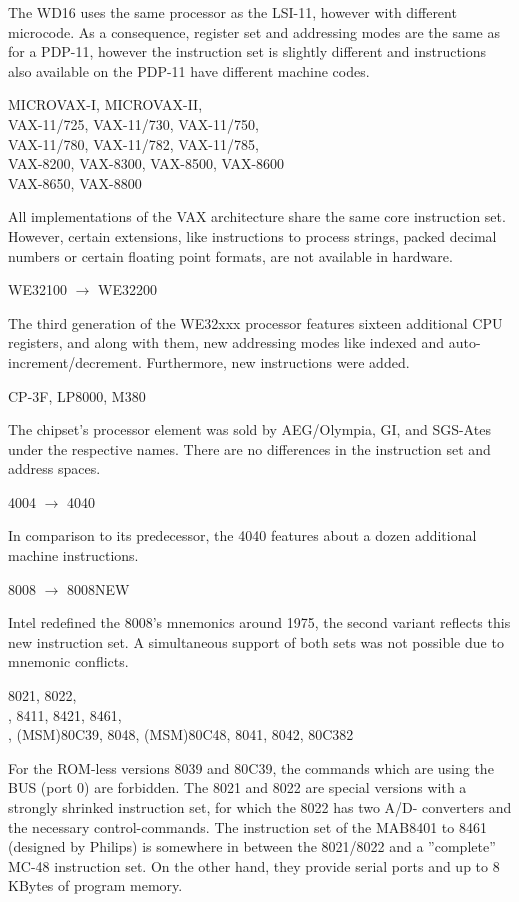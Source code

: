 \documentclass[12pt,twoside]{report}
\begin{document}
The WD16 uses the same processor as the LSI-11, however
with different microcode.  As a consequence, register set
and addressing modes are the same as for a PDP-11, however
the instruction set is slightly different and instructions
also available on the PDP-11 have different machine codes.
\begin{cpulist}
   MICROVAX-I, MICROVAX-II, \\
\> VAX-11/725, VAX-11/730, VAX-11/750, \\
\> VAX-11/780, VAX-11/782, VAX-11/785, \\
\> VAX-8200, VAX-8300, VAX-8500, VAX-8600 \\
\> VAX-8650, VAX-8800
\end{cpulist}
All implementations of the VAX architecture share the same
core instruction set.  However, certain extensions, like
instructions to process strings, packed decimal numbers or
certain floating point formats, are not available in hardware.
\begin{cpulist}
   WE32100 $\rightarrow$ WE32200
\end{cpulist}
The third generation of the WE32xxx processor features sixteen
additional CPU registers, and along with them, new addressing
modes like indexed and auto-increment/decrement.  Furthermore,
new instructions were added.
\begin{cpulist}
   CP-3F, LP8000, M380
\end{cpulist}
The chipset's processor element was sold by AEG/Olympia, GI,
and SGS-Ates under the respective names.  There are no differences
in the instruction set and address spaces.
\begin{cpulist}
   4004 $\rightarrow$ 4040
\end{cpulist}
In comparison to its predecessor, the 4040 features about a dozen
additional machine instructions.
\begin{cpulist}
   8008 $\rightarrow$ 8008NEW
\end{cpulist}
Intel redefined the 8008's mnemonics around 1975, the second variant reflects
this new instruction set.  A simultaneous support of both sets was not
possible due to mnemonic conflicts.
\begin{cpulist}
   8021, 8022, \\
, 8411, 8421, 8461, \\
, (MSM)80C39, 8048, (MSM)80C48, 8041, 8042, 80C382
\end{cpulist}
For the ROM-less versions 8039 and 80C39, the commands which are
using the BUS (port 0) are forbidden.  The 8021 and 8022 are special
versions with a strongly shrinked instruction set, for which the 8022
has two A/D- converters and the necessary control-commands.  The 
instruction set of the MAB8401 to 8461 (designed by Philips) is
somewhere in between the 8021/8022 and a ''complete'' MC-48 instruction
set.  On the other hand, they provide serial ports and up to 8 KBytes
of program memory.
\end{document}
